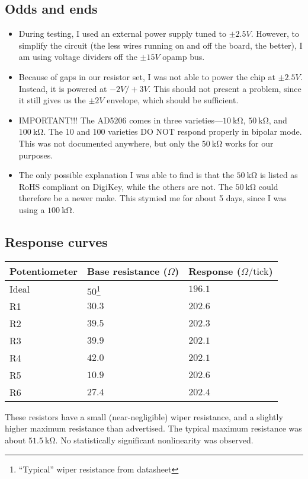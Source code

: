 \documentclass[fleqn]{article}
\begin{document}
    \subsection*{Odds and ends}
        \begin{itemize}
            \item During testing, I used an external power supply tuned to $\pm2.5V$. However, to simplify the circuit (the less wires running on and off the board, the better), I am using voltage dividers off the $\pm15V$ opamp bus.
            \item Because of gaps in our resistor set, I was not able to power the chip at $\pm2.5V$. Instead, it is powered at $-2V/+3V$. This should not present a problem, since it still gives us the $\pm2V$ envelope, which should be sufficient. 
            \item IMPORTANT!!! The AD5206 comes in three varieties---$\SI{10}{\kilo\ohm}$, $\SI{50}{\kilo\ohm}$, and $\SI{100}{\kilo\ohm}$. The 10 and 100 varieties DO NOT respond properly in bipolar mode. This was not documented anywhere, but only the $\SI{50}{\kilo\ohm}$ works for our purposes.
            \item The only possible explanation I was able to find is that the $\SI{50}{\kilo\ohm}$ is listed as RoHS compliant on DigiKey, while the others are not. The $\SI{50}{\kilo\ohm}$ could therefore be a newer make. This stymied me for about 5 days, since I was using a $\SI{100}{\kilo\ohm}$.
        \end{itemize}
        \subsection*{Response curves}
        \begin{tabular}{lll}
            \toprule
            Potentiometer & Base resistance ($\Omega$) & Response ($\Omega/\text{tick}$) \\ \midrule
            Ideal & $50$\footnote{``Typical'' wiper resistance from datasheet} & $196.1$ \\
            R1 & $30.3$ & $202.6$ \\
            R2 & $39.5$ & $202.3$ \\
            R3 & $39.9$ & $202.1$ \\
            R4 & $42.0$ & $202.1$ \\
            R5 & $10.9$ & $202.6$ \\
            R6 & $27.4$ & $202.4$ \\\bottomrule
        \end{tabular}\vspace{1em}

        \noindent These resistors have a small (near-negligible) wiper resistance, and a slightly higher maximum resistance than advertised. The typical maximum resistance was about $\SI{51.5}{\kilo\ohm}$. No statistically significant nonlinearity was observed.
    
\end{document}
